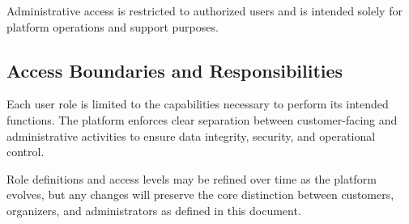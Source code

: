 Administrative access is restricted to authorized users and is intended solely
for platform operations and support purposes.

\subsection{Access Boundaries and Responsibilities}

Each user role is limited to the capabilities necessary to perform its intended
functions. The platform enforces clear separation between customer-facing and
administrative activities to ensure data integrity, security, and operational
control.

Role definitions and access levels may be refined over time as the platform
evolves, but any changes will preserve the core distinction between customers,
organizers, and administrators as defined in this document.
